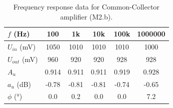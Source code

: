 \documentclass[12pt,a4paper]{article}
\begin{document}
\begin{table}[H]
    \centering
    \caption{Frequency response data for Common-Collector amplifier (M2.b).}
    \label{tab:freq_response_m2}
    \begin{tabular}{lccccc}
        \toprule
        {$f$ (\si{Hz})} & 100 & 1k & 10k & 100k & 1000000 \\
        \midrule
        {$U_{in}$ (\si{mV})} & 1050 & 1010 & 1010 & 1010 & 1000 \\
        {$U_{out}$ (\si{mV})} & 960 & 920 & 920 & 928 & 928 \\
        {$A_u$} & 0.914 & 0.911 & 0.911 & 0.919 & 0.928 \\
        {$a_u$ (\si{dB})} & -0.78 & -0.81 & -0.81 & -0.74 & -0.65 \\
        {$\phi$ (\si{\degree})} & 0.0 & 0.2 & 0.0 & 0.0 & 7.2 \\
        \bottomrule
    \end{tabular}
\end{table}
\end{document}
